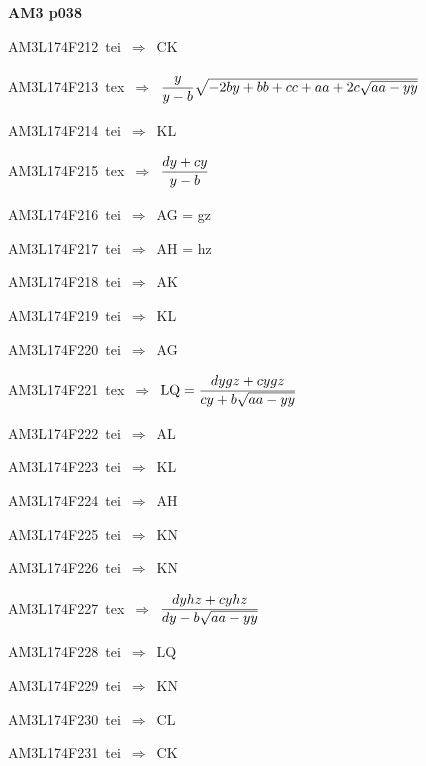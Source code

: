 \par\vfill\eject
{\bf\hfill AM3 p038\hfill\hbox{}}\par\bigskip
{\sixrm AM3L174F212\ {\sixit tei}\ }$\Rightarrow$\ CK\par\smallskip
{\sixrm AM3L174F213\ {\sixit tex}\ }$\Rightarrow$\ ${\displaystyle\strut {y}\over \displaystyle\strut {y - b}}\sqrt{ - 2by + bb + cc + aa + 2c\sqrt{aa - yy}}$\par\smallskip
{\sixrm AM3L174F214\ {\sixit tei}\ }$\Rightarrow$\ KL\par\smallskip
{\sixrm AM3L174F215\ {\sixit tex}\ }$\Rightarrow$\ ${\displaystyle\strut {dy + cy}\over \displaystyle\strut {y - b}}$\par\smallskip
{\sixrm AM3L174F216\ {\sixit tei}\ }$\Rightarrow$\ AG = {\tenit gz}\par\smallskip
{\sixrm AM3L174F217\ {\sixit tei}\ }$\Rightarrow$\ AH = {\tenit hz}\par\smallskip
{\sixrm AM3L174F218\ {\sixit tei}\ }$\Rightarrow$\ AK\par\smallskip
{\sixrm AM3L174F219\ {\sixit tei}\ }$\Rightarrow$\ KL\par\smallskip
{\sixrm AM3L174F220\ {\sixit tei}\ }$\Rightarrow$\ AG\par\smallskip
{\sixrm AM3L174F221\ {\sixit tex}\ }$\Rightarrow$\ ${\rm LQ} = {\displaystyle\strut {dygz + cygz}\over \displaystyle\strut {cy + b\sqrt{aa - yy}}}$\par\smallskip
{\sixrm AM3L174F222\ {\sixit tei}\ }$\Rightarrow$\ AL\par\smallskip
{\sixrm AM3L174F223\ {\sixit tei}\ }$\Rightarrow$\ KL\par\smallskip
{\sixrm AM3L174F224\ {\sixit tei}\ }$\Rightarrow$\ AH\par\smallskip
{\sixrm AM3L174F225\ {\sixit tei}\ }$\Rightarrow$\ KN\par\smallskip
{\sixrm AM3L174F226\ {\sixit tei}\ }$\Rightarrow$\ KN\par\smallskip
{\sixrm AM3L174F227\ {\sixit tex}\ }$\Rightarrow$\ ${\displaystyle\strut {dyhz + cyhz}\over \displaystyle\strut {dy - b\sqrt{aa - yy}}}$\par\smallskip
{\sixrm AM3L174F228\ {\sixit tei}\ }$\Rightarrow$\ LQ\par\smallskip
{\sixrm AM3L174F229\ {\sixit tei}\ }$\Rightarrow$\ KN\par\smallskip
{\sixrm AM3L174F230\ {\sixit tei}\ }$\Rightarrow$\ CL\par\smallskip
{\sixrm AM3L174F231\ {\sixit tei}\ }$\Rightarrow$\ CK\par\smallskip
